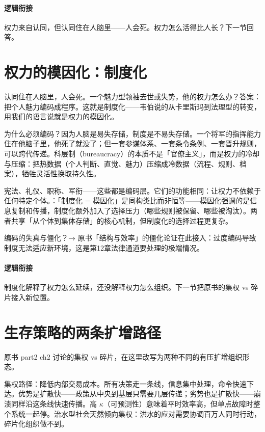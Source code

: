 \documentclass[../../main2.tex]{subfiles}
\begin{document}
	\paragraph*{逻辑衔接}
	权力来自认同，但认同住在人脑里——人会死。权力怎么活得比人长？下一节回答。
	\section{权力的模因化：制度化}
	\label{sec:pol-institutionalization}
	认同住在人脑里，人会死。一个魅力型领袖去世或失势，他的权力怎么办？答案：把个人魅力编码成程序。这就是制度化——韦伯说的从卡里斯玛到法理型的转变，用我们的语言说就是权力的模因化。

	为什么必须编码？因为人脑是易失存储，制度是不易失存储。一个将军的指挥能力住在他脑子里，他死了就没了；但一套参谋体系、一套条令条例、一套晋升规则，可以跨代传递。科层制（bureaucracy）的本质不是「官僚主义」，而是权力的冷却与压缩：把热数据（个人判断、直觉、魅力）压缩成冷数据（流程、规则、档案），牺牲灵活性换取持久性。

	宪法、礼仪、职称、军衔——这些都是编码层。它们的功能相同：让权力不依赖于任何特定个体。：「制度化 = 模因化」是同构类比而非恒等——模因化强调的是信息复制和传播，制度化额外加入了选择压力（哪些规则被保留、哪些被淘汰）。两者共享「从个体到集体存储」的核心机制，但制度化的选择过程更复杂。

	\begin{reader_anticipation}
		\item 编码的失真与僵化？→ 原书「结构与效率」的僵化论证在此接入：过度编码导致制度无法适应新环境，这是第12章法律通道要处理的极端情况。
	\end{reader_anticipation}

	\paragraph*{逻辑衔接}
	制度化解释了权力怎么延续，还没解释权力怎么组织。下一节把原书的集权 vs 碎片接入新位置。
	\section{生存策略的两条扩增路径}
	\label{sec:pol-two-paths}
	原书 part2 ch2 讨论的集权 vs 碎片，在这里改写为两种不同的有压扩增组织形态。

	集权路径：降低内部交易成本。所有决策走一条线，信息集中处理，命令快速下达。优势是扩散快——政策从中央到基层只需要几层传递；劣势也是扩散快——崩溃同样沿这条线快速传播。高 $\kappa$（可预测性）意味着平时效率高，但单点故障时整个系统一起停。治水型社会天然倾向集权：洪水的应对需要协调百万人同时行动，碎片化组织做不到。
\end{document}
